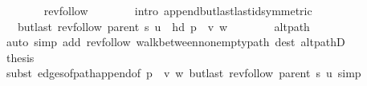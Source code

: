 \begin{isabellebody}
\ \ \ \ \ \ \isamarkupfalse%
\ rev{\isacharunderscore}{\kern0pt}follow{\isacharparenleft}{\kern0pt}{}{\isacharparenright}{\kern0pt}\isanewline
\ \ \ \ \ \ \isamarkupfalse%
\ {\isacharparenleft}{\kern0pt}intro\ append{\isacharunderscore}{\kern0pt}butlast{\isacharunderscore}{\kern0pt}last{\isacharunderscore}{\kern0pt}id{\isacharbrackleft}{\kern0pt}symmetric{\isacharbrackright}{\kern0pt}{\isacharparenright}{\kern0pt}\isanewline
\ \ \ \ \isamarkupfalse%
\ \isamarkupfalse%
\ {\isachardoublequoteopen}{\isachardot}{\kern0pt}{\isachardot}{\kern0pt}{\isachardot}{\kern0pt}\ {\isacharequal}{\kern0pt}\ butlast\ {\isacharparenleft}{\kern0pt}rev{\isacharunderscore}{\kern0pt}follow\ {\isacharparenleft}{\kern0pt}parent\ s{\isacharparenright}{\kern0pt}\ u{\isacharparenright}{\kern0pt}\ {\isacharat}{\kern0pt}\ {\isacharbrackleft}{\kern0pt}hd\ {\isacharparenleft}{\kern0pt}p\ {\isacharat}{\kern0pt}\ {\isacharbrackleft}{\kern0pt}v{\isacharcomma}{\kern0pt}\ w{\isacharbrackright}{\kern0pt}{\isacharparenright}{\kern0pt}{\isacharbrackright}{\kern0pt}{\isachardoublequoteclose}\isanewline
\ \ \ \ \ \ \isamarkupfalse%
\ alt{\isacharunderscore}{\kern0pt}path\isanewline
\ \ \ \ \ \ \isamarkupfalse%
\ {\isacharparenleft}{\kern0pt}auto\ simp\ add{\isacharcolon}{\kern0pt}\ rev{\isacharunderscore}{\kern0pt}follow{\isacharparenleft}{\kern0pt}{}{\isacharparenright}{\kern0pt}\ walk{\isacharunderscore}{\kern0pt}between{\isacharunderscore}{\kern0pt}nonempty{\isacharunderscore}{\kern0pt}path{\isacharparenleft}{\kern0pt}{}{\isacharparenright}{\kern0pt}\ dest{\isacharcolon}{\kern0pt}\ alt{\isacharunderscore}{\kern0pt}pathD{\isacharparenleft}{\kern0pt}{}{\isacharparenright}{\kern0pt}{\isacharparenright}{\kern0pt}\isanewline
\ \ \ \ \isamarkupfalse%
\ \isamarkupfalse%
\ {\isacharquery}{\kern0pt}thesis\isanewline
\ \ \ \ \ \ \isamarkupfalse%
\ {\isacharparenleft}{\kern0pt}subst\ edges{\isacharunderscore}{\kern0pt}of{\isacharunderscore}{\kern0pt}path{\isacharunderscore}{\kern0pt}append{\isacharunderscore}{\kern0pt}{}{\isacharbrackleft}{\kern0pt}of\ {\isachardoublequoteopen}p\ {\isacharat}{\kern0pt}\ {\isacharbrackleft}{\kern0pt}v{\isacharcomma}{\kern0pt}\ w{\isacharbrackright}{\kern0pt}{\isachardoublequoteclose}\ {\isachardoublequoteopen}butlast\ {\isacharparenleft}{\kern0pt}rev{\isacharunderscore}{\kern0pt}follow\ {\isacharparenleft}{\kern0pt}parent\ s{\isacharparenright}{\kern0pt}\ u{\isacharparenright}{\kern0pt}{\isachardoublequoteclose}{\isacharbrackright}{\kern0pt}{\isacharparenright}{\kern0pt}\ simp{\isacharplus}{\kern0pt}\isanewline

\end{isabellebody}
